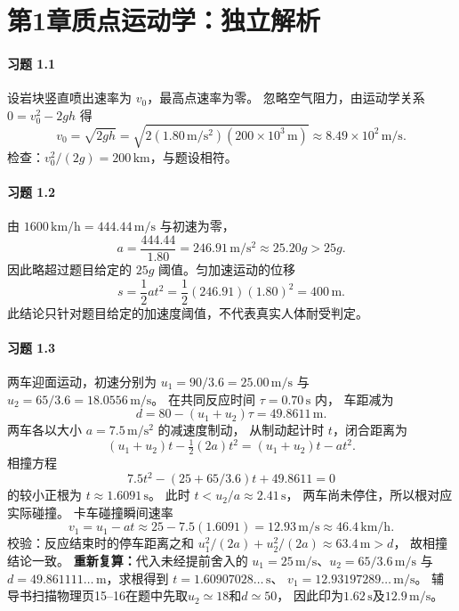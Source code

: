 \section*{第1章\quad 质点运动学：独立解析}

\paragraph{习题 1.1}
设岩块竖直喷出速率为 \(v_0\)，最高点速率为零。
忽略空气阻力，由运动学关系 \(0=v_0^2-2gh\) 得
\[
 v_0=\sqrt{2gh}
 =\sqrt{2(1.80\,\mathrm{m/s^2})(200\times10^3\,\mathrm{m})}
 \approx 8.49\times10^2\,\mathrm{m/s}.
\]
检查：\(v_0^2/(2g)=200\,\mathrm{km}\)，与题设相符。

\paragraph{习题 1.2}
由 \(1600\,\mathrm{km/h}=444.44\,\mathrm{m/s}\) 与初速为零，
\[
 a=\frac{444.44}{1.80}=246.91\,\mathrm{m/s^2}
 \approx25.20g>25g.
\]
因此略超过题目给定的 \(25g\) 阈值。匀加速运动的位移
\[
 s=\frac12at^2
 =\frac12(246.91)(1.80)^2=400\,\mathrm{m}.
\]
此结论只针对题目给定的加速度阈值，不代表真实人体耐受判定。

\paragraph{习题 1.3}
两车迎面运动，初速分别为
\(u_1=90/3.6=25.00\,\mathrm{m/s}\) 与
\(u_2=65/3.6=18.0556\,\mathrm{m/s}\)。
在共同反应时间 \(\tau=0.70\,\mathrm{s}\) 内，
车距减为
\[
 d=80-(u_1+u_2)\tau=49.8611\,\mathrm{m}.
\]
两车各以大小 \(a=7.5\,\mathrm{m/s^2}\) 的减速度制动，
从制动起计时 \(t\)，闭合距离为
\[
 (u_1+u_2)t-\tfrac12(2a)t^2
 =(u_1+u_2)t-at^2.
\]
相撞方程
\[
 7.5t^2-(25+65/3.6)t+49.8611=0
\]
的较小正根为 \(t\approx1.6091\,\mathrm{s}\)。
此时 \(t<u_2/a\approx2.41\,\mathrm{s}\)，
两车尚未停住，所以根对应实际碰撞。
卡车碰撞瞬间速率
\[
 v_1=u_1-at
 \approx25-7.5(1.6091)
 =12.93\,\mathrm{m/s}\approx46.4\,\mathrm{km/h}.
\]
校验：反应结束时的停车距离之和
\(u_1^2/(2a)+u_2^2/(2a)\approx63.4\,\mathrm{m}>d\)，
故相撞结论一致。
\textbf{重新复算：}代入未经提前舍入的
\(u_1=25\,\mathrm{m/s}\)、\(u_2=65/3.6\,\mathrm{m/s}\)
与\(d=49.861111\ldots\,\mathrm m\)，求根得到
\(t=1.60907028\ldots\,\mathrm s\)、
\(v_1=12.93197289\ldots\,\mathrm{m/s}\)。
辅导书扫描物理页15--16在题中先取\(u_2\simeq18\)和\(d\simeq50\)，
因此印为\(1.62\,\mathrm s\)及\(12.9\,\mathrm{m/s}\)。

